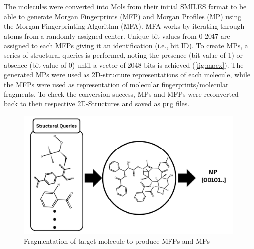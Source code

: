 The molecules were converted into Mols from their initial SMILES format to be able to generate Morgan Fingerprints (MFP) and Morgan Profiles (MP) using the Morgan Fingerprinting Algorithm (MFA). MFA works by iterating through atoms from a randomly assigned center. Unique bit values from 0-2047 are assigned to each MFPs giving it an identification (i.e., bit ID). To create MPs, a series of structural queries is performed, noting the presence (bit value of 1) or absence (bit value of 0) until a vector of 2048 bits is achieved (\autoref{fig:mpex}). The generated MPs were used as 2D-structure representations of each molecule, while the MFPs were used as representation of molecular fingerprints/molecular fragments. To check the conversion success, MPs and MFPs were reconverted back to their respective 2D-Structures and saved as png files.

\begin{figure}[htbp!] %
	\centering
	\includegraphics[scale = 0.25]{Mprofile2.png}%
	\caption{Fragmentation of target molecule to produce MFPs and MPs}
	\label{fig:mpex} %
\end{figure} 

    

